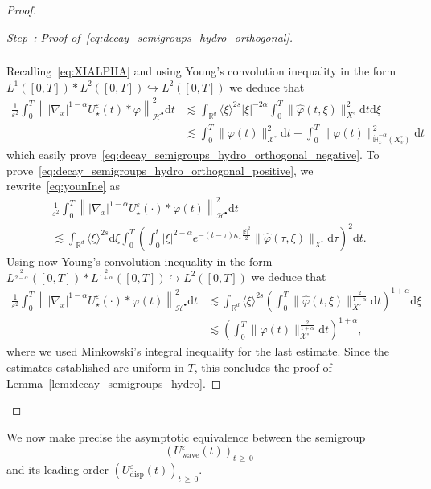 \documentclass[10pt]{amsart}
\theoremstyle{definition}\newtheorem{defi}[theo]{Definition}\newtheorem{rema}[theo]{Remark}\newtheorem{exam}[theo]{Example}\newtheorem{exem}[theo]{Example}\newtheorem{nota}[theo]{Notation}
\renewcommand{\d}{\mathrm{d}}
\newcommand{\Wave}{\mathrm{wave}}
\newcommand{\disp}{\mathrm{disp}}
\newcommand{\R}{\mathbb{R}}
\newcommand{\bbH}{\mathbb{H}}
\newcommand{\XX}{\mathcal{X}}
\newcommand{\HH}{\mathcal{H}}
\newcommand{\SSsp}{\HH^{\bullet}}
\newcommand{\Slm}{X^{\circ}}
\newcommand{\SSlm}{\XX^{\circ}}
\renewcommand*\ge{\geqslant}
\renewcommand*\geq{\geqslant}
\newcommand*\eps{{\varepsilon}}
\newcommand{\la}{\langle}
\newcommand{\ra}{\rangle}
\newcounter{stepcount}
\newenvironment{step}[1]{\refstepcounter{stepcount}\begin{proof}[Step~\thestepcount: #1]}{\let\qed\relax\end{proof}}
\begin{document}
\begin{proof}
\begin{step}{{Proof of~\eqref{eq:decay_semigroups_hydro_orthogonal}}}
\begin{multline}
\begin{aligned}
\end{aligned}
\end{multline}
Recalling~\eqref{eq:XIALPHA} and using Young's convolution inequality in the form $L^1([0, T] ) \ast L^2([0, T]) \hookrightarrow L^2([0, T])$ we deduce that
\begin{align*}
\frac{1}{\eps^2} \int_0^T \left\| |\nabla_x|^{1-\alpha} U^\eps_\star(t) * \varphi \right\|_{\SSsp}^2 \d t & \lesssim \int_{\R^{d}} \la \xi \ra^{2 s} | \xi |^{-2\alpha} \int_0^T \| \widehat{\varphi}(t, \xi) \|_{\Slm}^2 \d t \d \xi \\
& \lesssim \int_0^T \| \varphi(t) \|_{\SSlm}^2 \d t + \int_0^T \| \varphi(t) \|_{ \dot{\bbH}^{-\alpha}_x \left(\Slm_v\right) }^2 \d t\,
\end{align*}
which easily prove~\eqref{eq:decay_semigroups_hydro_orthogonal_negative}. To prove~\eqref{eq:decay_semigroups_hydro_orthogonal_positive}, we rewrite~\eqref{eq:younIne} as
\begin{multline*}
\frac{1}{\eps^2} \int_0^T\left \| |\nabla_x|^{1-\alpha}  U^\eps_\star(\cdot) * \varphi(t) \right\|_{\SSsp}^2 \d t
\\
 \lesssim \int_{\R^d}\langle \xi\rangle^{2s}\d \xi\int_0^T \left(\int_0^t |\xi|^{2-\alpha}e^{-(t-\tau)\kappa_{\star}\frac{|\xi|^2}{2}}\|\widehat{\varphi}(\tau,\xi)\|_{\Slm}\d\tau\right)^2\d t.
\end{multline*}
Using now Young's convolution inequality in the form $L^{\frac{2}{2-\alpha}}([0, T]) \ast L^{\frac{2}{1+\alpha}}([0, T]) \hookrightarrow L^2([0, T])$ we deduce that
\begin{align*}
\frac{1}{\eps^2} \int_0^T \left\| |\nabla_x|^{1-\alpha} U^\eps_\star(\cdot) * \varphi(t) \right\|_{\SSsp}^2 \d t & \lesssim \int_{\R^{d}} \la \xi \ra^{2 s} \left(\int_0^T \| \widehat{\varphi}(t, \xi) \|_{\Slm}^{\frac{2}{1+\alpha}} \d t\right)^{1+\alpha} \d \xi \\
& \lesssim \left(\int_0^T \| \varphi(t) \|_{\SSlm}^{\frac{2}{1+\alpha}} \d t\right)^{1+\alpha},
\end{align*}
where we used Minkowski's integral inequality for the last estimate. Since the estimates established are uniform in $T$, this concludes the proof of Lemma~\ref{lem:decay_semigroups_hydro}.\qedhere
\end{step}\let\qed\relax
\end{proof}

We now make precise the asymptotic equivalence between the semigroup
\[
(U^{\eps}_{\Wave}(t))_{t\,\ge\,0}
\]
and its leading order $(U^{\eps}_{\disp}(t))_{t\,\geq\,0}$.
\end{document}
